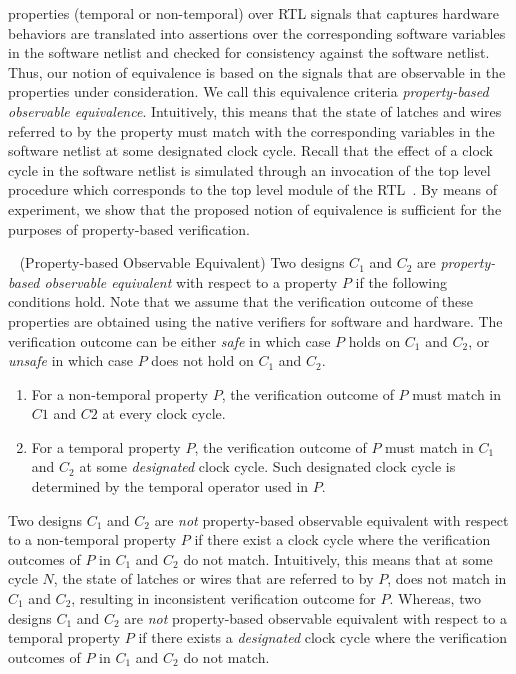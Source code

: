 properties (temporal or non-temporal) over RTL signals that captures hardware behaviors 
are translated into assertions over the corresponding software variables in 
the software netlist and checked for consistency against the software
netlist.  Thus, our notion of equivalence is based on the signals 
that are observable in the properties under consideration.  We call this equivalence criteria 
\emph{property-based observable equivalence}.  
Intuitively, this means that the state of latches and wires 
referred to by the property must match with the corresponding variables in the 
software netlist at some designated clock cycle.  Recall that the effect of a clock cycle 
in the software netlist is simulated through an invocation of the top 
level procedure which corresponds to the top level module of the RTL~\cite{mtk2016}.  
By means of experiment, we show that the proposed notion of equivalence is sufficient for the 
purposes of property-based verification.
%
%
\begin{definition}~\label{verilog-c-eq} (Property-based Observable Equivalent) 
  Two designs $C_1$ and $C_2$ are \emph{property-based observable equivalent} with
  respect to a property $P$ if the following conditions hold.  Note that we assume 
  that the verification outcome of these properties are obtained using the native 
  verifiers for software and hardware.  The verification outcome can be 
  either \emph{safe} in which case $P$ holds on $C_1$ and $C_2$, or \emph{unsafe} 
  in which case $P$ does not hold on $C_1$ and $C_2$. 
  \begin{enumerate}
    \item For a non-temporal property $P$, the verification outcome of $P$ must
      match in $C1$ and $C2$ at every clock cycle.  
   \item For a temporal property $P$, the verification outcome of $P$ must 
     match in $C_1$ and $C_2$ at some \emph{designated} clock cycle.  Such
      designated clock cycle is determined by the temporal operator used in $P$. 
  \end{enumerate}
\end{definition}
%
Two designs $C_1$ and $C_2$ are \emph{not} property-based observable equivalent 
with respect to a non-temporal property $P$ if there exist a clock cycle where 
the verification outcomes of $P$ in $C_1$ and $C_2$ do not match.  Intuitively, 
this means that at some cycle $N$, 
the state of latches or wires that are referred to by $P$, does not match in 
$C_1$ and $C_2$, resulting in inconsistent verification outcome for $P$. 
% 
Whereas, two designs $C_1$ and $C_2$ are \emph{not} property-based observable equivalent 
with respect to a temporal property $P$ if there exists a \emph{designated} clock cycle 
where the verification outcomes of $P$ in $C_1$ and $C_2$ do not match.  




